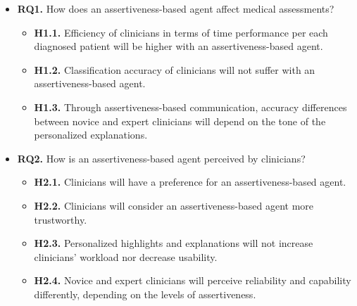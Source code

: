 \begin{itemize}
\item {\bf RQ1.} How does an assertiveness-based agent affect medical assessments?
\begin{itemize}
\item {\bf H1.1.} Efficiency of clinicians in terms of time performance per each diagnosed patient will be higher with an assertiveness-based agent.
\item {\bf H1.2.} Classification accuracy of clinicians will not suffer with an assertiveness-based agent.
\item {\bf H1.3.} Through assertiveness-based communication, accuracy differences between novice and expert clinicians will depend on the tone of the personalized explanations.
\end{itemize}
\item {\bf RQ2.} How is an assertiveness-based agent perceived by clinicians?
\begin{itemize}
\item {\bf H2.1.} Clinicians will have a preference for an assertiveness-based agent.
\item {\bf H2.2.} Clinicians will consider an assertiveness-based agent more trustworthy.
\item {\bf H2.3.} Personalized highlights and explanations will not increase clinicians' workload nor decrease usability.
\item {\bf H2.4.} Novice and expert clinicians will perceive reliability and capability differently, depending on the levels of assertiveness.
\end{itemize}
\end{itemize}

